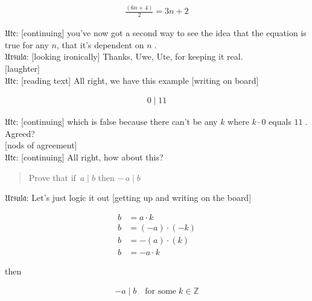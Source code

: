 \documentclass[american]{article}
\begin{document}
\begin{align}
\frac{(6n + 4)}{2} = 3n + 2 
\end{align}

𝔘𝔱𝔢: [continuing]
you've now got a second way to see the idea that the equation is true
for any \(n\), that it's dependent on \(n\;\). \\[0pt]
𝔘𝔯𝔰𝔲𝔩𝔞: [looking
ironically] Thanks, Uwe, Ute, for keeping it real. \\[0pt]
[laughter] \\[0pt]
𝔘𝔱𝔢: [reading text] All
right, we have this example [writing on board]

\begin{align*}
0 \mid 11
\end{align*}

𝔘𝔱𝔢: [continuing] which
is false because there can't be any \(k\) where \(k \cdot 0\) equals
\(11\;\). Agreed? \\[0pt]
[nods of agreement] \\[0pt]
𝔘𝔱𝔢: [continuing] All
right, how about this?

\begin{quote}
Prove that if \(\,a \mid b\) then \(-\, a \mid b\)
\end{quote}

𝔘𝔯𝔰𝔲𝔩𝔞: Let's just
logic it out [getting up and writing on the board]

\begin{align*}
b & = a \cdot k \\[.4em]
b &= (-a) \cdot (-k) \\[.4em]
b &= - (a) \cdot (k) \\[.4em]
b &= - a \cdot k 
\end{align*}

then

\begin{align*}
- a \mid b  \quad \text{for some}\; k \in \mathbb{Z}
\end{align*}
\end{document}
